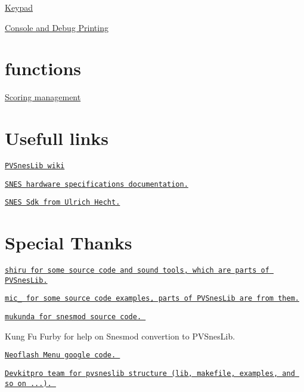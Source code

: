 \begin{DoxyItemize}
\item \hyperlink{a00350}{Keypad}
\item \hyperlink{a00335}{Console and Debug Printing}
\end{DoxyItemize}\hypertarget{index_Miscellaneous}{}\section{functions}\label{index_Miscellaneous}

\begin{DoxyItemize}
\item \hyperlink{a00356}{Scoring management}
\end{DoxyItemize}\hypertarget{index_external_links}{}\section{Usefull links}\label{index_external_links}

\begin{DoxyItemize}
\item \href{http://www.portabledev.com/wiki/doku.php}{\tt P\+V\+Snes\+Lib wiki}
\item \href{http://nocash.emubase.de/sns.htm}{\tt S\+N\+ES hardware specifications documentation.}
\item \href{http://code.google.com/p/snes-sdk/}{\tt S\+N\+ES Sdk from Ulrich Hecht.}
\end{DoxyItemize}\hypertarget{index_special_thanks}{}\section{Special Thanks}\label{index_special_thanks}

\begin{DoxyItemize}
\item \href{http://shiru.untergrund.net/}{\tt shiru for some source code and sound tools, which are parts of P\+V\+Snes\+Lib.}
\item \href{http://jiggawatt.org/badc0de/index.html}{\tt mic\+\_\+ for some source code examples, parts of P\+V\+Snes\+Lib are from them.}
\item \href{http://snes.mukunda.com/}{\tt mukunda for snesmod source code. }
\item Kung Fu Furby for help on Snesmod convertion to P\+V\+Snes\+Lib.
\item \href{http://code.google.com/p/neo-myth-menu/}{\tt Neoflash Menu google code. }
\item \href{http://www.devkitpro.org/}{\tt Devkitpro team for pvsneslib structure (lib, makefile, examples, and so on ...). } 
\end{DoxyItemize}